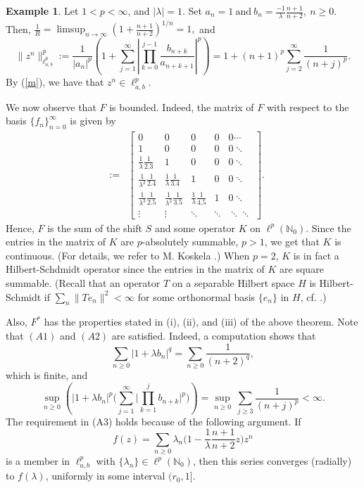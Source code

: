 \documentclass[12pt, reqno]{amsart}
\theoremstyle{definition}
\newtheorem{example}[theorem]{Example}
\theoremstyle{remark}
\numberwithin{equation}{section}
\begin{document}
\begin{example}\label{example} Let $1<p<\infty$, and $|\lambda|=1$. Set
$
a_{n}=1 ~\text{and}~ b_{n}=\frac{-1}{\lambda} \frac{n+1}{n+2}, ~n\geq 0.$ Then, $\frac{1}{R}=\limsup_{n\rightarrow \infty}\left(1+\frac{n+1}{n+2}\right)^{1/n}=1,$
and 
\[
\|z^n\|_{\ell^p_{a,b}}^p:=\frac{1}{|a_{n}|^{p}}\left(1+
\sum_{j=1}^{\infty}
\left|\prod_{k=0}^{j-1}\frac{b_{n+k}}{a_{n+k+1}}
\right|^{p}\right)=1+(n+1)^p\sum_{j=2}^{\infty}\frac{1}{(n+j)^p}.
\]
By (\ref{m}), we have that $z^n \in \ell^p_{a,b}.$

We now observe that $F$ is bounded. Indeed, the matrix of $F$ with respect to the basis $\{f_n\}_{n=0}^{\infty}$ is given by
\begin{eqnarray*}
     [F]&:=&\begin{bmatrix} 0 & 0 & 0&0&0\cdots\\ 1 & 0 & 0&0&0\ddots\\ \frac{1}{\lambda}\frac{1}{2.3} & 1 & 0&0&0\ddots\\ \frac{1}{\lambda^{2}}\frac{1}{2.4} & \frac{1}{\lambda}\frac{1}{3.4} & 1&0&0\ddots\\ \frac{1}{\lambda^{3}}\frac{1}{2.5} &\frac{1}{\lambda^{2}}\frac{1}{3.5} & \frac{1}{\lambda}\frac{1}{4.5}&1&0\ddots\\ \vdots&\vdots &\ddots&\ddots&\ddots\ddots \end{bmatrix}.
\end{eqnarray*}
Hence, $F$ is the sum of the shift $S$ and some operator $K$ on $\ell^p(\mathbb{N}_0)$. Since the entries in the matrix of $K$ are $p$-absolutely summable, $p>1$, we get that $K$ is continuous. (For details, we refer to M. Koskela \cite{Koskela}.) When $p=2$, $K$ is in fact a Hilbert-Schdmidt operator since the entries in the matrix of $K$ are square summable. (Recall that an operator $T$ on a separable Hilbert space $H$ is Hilbert-Schmidt if $\sum_n \|Te_n\|^2<\infty$ for some orthonormal basis $\{e_n\}$ in $H$, cf. \cite{Halmos}.) 

Also, $F^*$ has the properties stated in (i), (ii), and (iii) of the above theorem. Note that $(A1)$ and $(A2)$ are satisfied. Indeed, a computation shows that
\[
\sum_{n\geq 0} |1+\lambda b_n|^q=\sum_{n\geq 0} \frac{1}{(n+2)^q},
\]
which is finite, and 
\[
 \sup_{n\geq 0}\left(|1+\lambda b_{n}|^{p}\Big(\sum_{j=1}^{\infty}
\Big|\prod_{k=1}^{j} b_{n+k}
\Big|^{p}\Big)\right)= \sup_{n\geq 0}~\sum_{j\geq 3}\frac{1}{(n+j)^{p}}<\infty.
\]
The requirement in (A3) holds because of the following argument. If
\[
f(z)=\sum_{n\geq 0}\lambda_n \Big(1-\frac{1}{\lambda}\frac{n+1}{n+2}z\Big)z^n
\]
is a member in $\ell^p_{a,b}$ with $\{\lambda_n\}\in \ell^p(\mathbb{N}_0)$, then this series converges (radially) to $f(\lambda)$, uniformly in some interval $(r_0,1]$.
\end{example}
\end{document}
